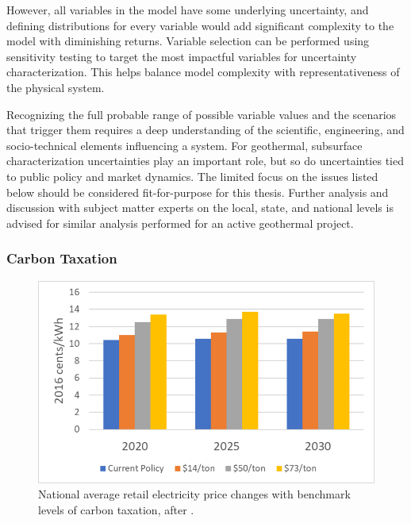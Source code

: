 However, all variables in the model have some underlying uncertainty, and defining distributions for every variable would add significant complexity to the model with diminishing returns. Variable selection can be performed using sensitivity testing to target the most impactful variables for uncertainty characterization. This helps balance model complexity with representativeness of the physical system. 

Recognizing the full probable range of possible variable values and the scenarios that trigger them requires a deep understanding of the scientific, engineering, and socio-technical elements influencing a system. For geothermal, subsurface characterization uncertainties play an important role, but so do uncertainties tied to public policy and market dynamics. The limited focus on the issues listed below should be considered fit-for-purpose for this thesis. Further analysis and discussion with subject matter experts on the local, state, and national levels is advised for similar analysis performed for an active geothermal project.

\subsubsection{Carbon Taxation}
\label{ch4:uncert_carbontax}
\begin{figure}
\centering
\includegraphics[scale=0.6]{templates/images/Figure-Carbon_Tax_Price_Impact.png}
\singlespacing
\caption[Carbon tax price impact]{National average retail electricity price changes with benchmark levels of carbon taxation, after \protect\citep[Fig.\ 30]{larson_energy_2018}.}
\label{fig:carbon_tax_pricing}
\end{figure}

